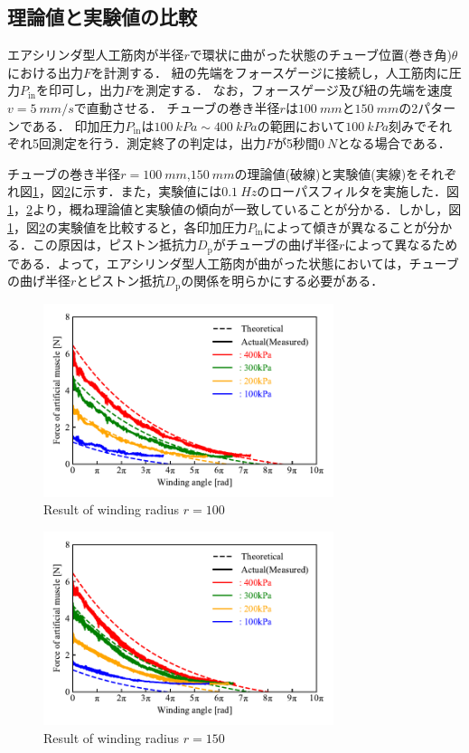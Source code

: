 \subsection{理論値と実験値の比較}%
エアシリンダ型人工筋肉が半径$r$で環状に曲がった状態のチューブ位置(巻き角)$\theta$における出力$F$を計測する．
紐の先端をフォースゲージに接続し，人工筋肉に圧力$P_\mathrm{in}$を印可し，出力$F$を測定する．
なお，フォースゲージ及び紐の先端を速度$v=\SI{5}{mm/s}$で直動させる．
チューブの巻き半径$r$は$\SI{100}{mm}$と$\SI{150}{mm}$の2パターンである．
印加圧力$P_\mathrm{in}$は$\SI{100}{kPa} \sim \SI{400}{kPa}$の範囲において$\SI{100}{kPa}$刻みでそれぞれ5回測定を行う．測定終了の判定は，出力$F$が5秒間$\SI{0}{N}$となる場合である．
\par
チューブの巻き半径$r=\SI{100}{mm}$,$\SI{150}{mm}$の理論値(破線)と実験値(実線)をそれぞれ図\ref{r=100mm}，図\ref{r=150mm}に示す．また，実験値には$\SI{0.1}{Hz}$のローパスフィルタを実施した．図\ref{r=100mm}，\ref{r=150mm}より，概ね理論値と実験値の傾向が一致していることが分かる．しかし，図\ref{r=100mm}，図\ref{r=150mm}の実験値を比較すると，各印加圧力$P_\mathrm{in}$によって傾きが異なることが分かる．この原因は，ピストン抵抗力$D_\mathrm{p}$がチューブの曲げ半径$r$によって異なるためである．よって，エアシリンダ型人工筋肉が曲がった状態においては，チューブの曲げ半径$r$とピストン抵抗$D_\mathrm{p}$の関係を明らかにする必要がある．
\begin{figure}[t]
  \centering
  \includegraphics[width=85mm]{_pdf/result_100mm.pdf}
  \caption{Result of winding radius $r=100$}
  \label{r=100mm}
\end{figure}

\begin{figure}[t]
  \centering
  \includegraphics[width=85mm]{_pdf/result_150mm.pdf}
  \caption{Result of winding radius $r=150$}
  \label{r=150mm}
\end{figure}

